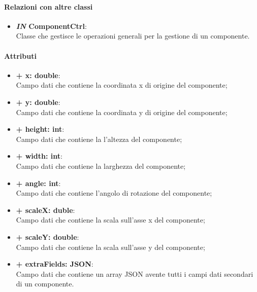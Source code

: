 	\paragraph{Relazioni con altre classi}
	\begin{itemize}
		\item \textbf{\textit{IN} ComponentCtrl}:\\
		Classe che gestisce le operazioni generali per la gestione di un componente.
	\end{itemize}
	
	\paragraph{Attributi}
	\begin{itemize}
		\item \textbf{+ x: double}:\\
			Campo dati che contiene la coordinata x di origine del componente;
		\item \textbf{+ y: double}:\\
			Campo dati che contiene la coordinata y di origine del componente;
		\item \textbf{+ height: int}:\\
			Campo dati che contiene la l'altezza del componente;
		\item \textbf{+ width: int}:\\
			Campo dati che contiene la larghezza del componente;
		\item \textbf{+ angle: int}:\\
			Campo dati che contiene l'angolo di rotazione del componente;
		\item \textbf{+ scaleX: duble}:\\
			Campo dati che contiene la scala sull'asse x del componente;
		\item \textbf{+ scaleY: double}:\\
			Campo dati che contiene la scala sull'asse y del componente;
		\item \textbf{+ extraFields: JSON}:\\
			Campo dati che contiene un array JSON avente tutti i campi dati secondari di un componente.
	\end{itemize}
\newpage
	

